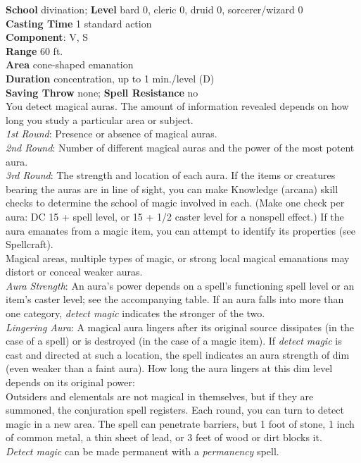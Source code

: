 \textbf{School} divination; \textbf{Level} bard 0, cleric 0, druid 0, sorcerer/wizard 0\\
\textbf{Casting Time} 1 standard action\\
\textbf{Component}: V, S\\
\textbf{Range} 60 ft.\\
\textbf{Area} cone-shaped emanation\\
\textbf{Duration} concentration, up to 1 min./level (D)\\
\textbf{Saving Throw} none; \textbf{Spell Resistance} no\\
You detect magical auras. The amount of information revealed depends on how long you study a particular area or subject.\\
\textit{1st Round}: Presence or absence of magical auras.\\
\textit{2nd Round}: Number of different magical auras and the power of the most potent aura.\\
\textit{3rd Round}: The strength and location of each aura. If the items or creatures bearing the auras are in line of sight, you can make Knowledge (arcana) skill checks to determine the school of magic involved in each. (Make one check per aura: DC 15 + spell level, or 15 + 1/2 caster level for a nonspell effect.) If the aura emanates from a magic item, you can attempt to identify its properties (see Spellcraft).\\
Magical areas, multiple types of magic, or strong local magical emanations may distort or conceal weaker auras.\\
\textit{Aura Strength}: An aura's power depends on a spell's functioning spell level or an item's caster level; see the accompanying table. If an aura falls into more than one category, \textit{detect magic }indicates the stronger of the two.\\
\textit{Lingering Aura}: A magical aura lingers after its original source dissipates (in the case of a spell) or is destroyed (in the case of a magic item). If \textit{detect magic }is cast and directed at such a location, the spell indicates an aura strength of dim (even weaker than a faint aura). How long the aura lingers at this dim level depends on its original power:\\
Outsiders and elementals are not magical in themselves, but if they are summoned, the conjuration spell registers. Each round, you can turn to detect magic in a new area. The spell can penetrate barriers, but 1 foot of stone, 1 inch of common metal, a thin sheet of lead, or 3 feet of wood or dirt blocks it.\\
\textit{Detect magic }can be made permanent with a \textit{permanency }spell.\\
